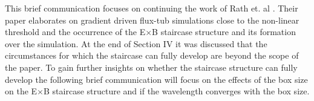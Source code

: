 \documentclass[aip, amsmath, amssymb, reprint, twocolumn]{revtex4-1}
\begin{document}










This brief communication focuses on continuing the work of Rath et. al \cite{doi:10.1063/1.4961231}. 
Their paper elaborates on gradient driven flux-tub simulations close to the non-linear threshold and the occurrence of the E$\times$B staircase structure and its formation over the simulation.
At the end of Section IV it was discussed that the circumstances for which the staircase can fully develop are beyond the scope of the paper.
To gain further insights on whether the staircase structure can fully develop the following brief communication will focus on the effects of the box size on the E$\times$B staircase structure and if the wavelength converges with the box size.\bigskip
\end{document}
